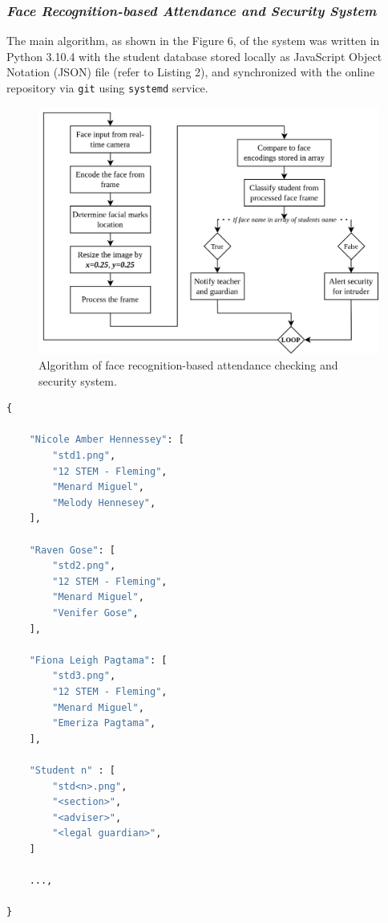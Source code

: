 \documentclass[12pt]{article}
\begin{document}
\subsubsection*{\emph{Face Recognition-based Attendance and Security System}}

The main algorithm, as shown in the Figure 6, of the system was written in Python 3.10.4 with the student database stored locally as JavaScript Object Notation (JSON) file (refer to Listing 2), and synchronized with the online repository via \texttt{git} using \texttt{systemd} service.

\begin{figure}[h!]
	\centering
	\includegraphics{fig_fr.png}
	\caption{Algorithm of face recognition-based attendance checking and security system.} \label{fig:4}
\end{figure}

\singlespacing
\begin{lstlisting}[language=Python, caption={Example of stored student information in database.}]
{
	
	"Nicole Amber Hennessey": [
		"std1.png",
		"12 STEM - Fleming",
		"Menard Miguel",
		"Melody Hennesey",
	],
	
	"Raven Gose": [
		"std2.png",
		"12 STEM - Fleming",
		"Menard Miguel",
		"Venifer Gose",
	],	
	
	"Fiona Leigh Pagtama": [
		"std3.png",
		"12 STEM - Fleming",
		"Menard Miguel",
		"Emeriza Pagtama",
	],
	
	"Student n" : [
		"std<n>.png",
		"<section>",
		"<adviser>",
		"<legal guardian>",
	]
	
	...,

}
\end{lstlisting}
\doublespacing
\end{document}
